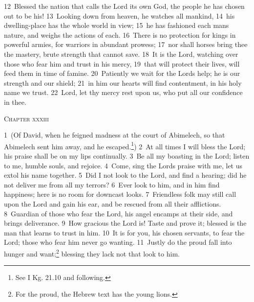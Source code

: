 \documentclass[10pt]{book} %
\begin{document}
\textcolor{benred8}{12}~Blessed the nation that calls the Lord its own God, the people he has chosen out to be his! \textcolor{benred8}{13}~Looking down from heaven, he watches all mankind, \textcolor{benred8}{14}~his dwelling-place has the whole world in view; \textcolor{benred8}{15}~he has fashioned each man\textquotesingle s nature, and weighs the actions of each. \textcolor{benred8}{16}~There is no protection for kings in powerful armies, for warriors in abundant prowess; \textcolor{benred8}{17}~nor shall horses bring thee the mastery, brute strength that cannot save. \textcolor{benred8}{18}~It is the Lord, watching over those who fear him and trust in his mercy, \textcolor{benred8}{19}~that will protect their lives, will feed them in time of famine. \textcolor{benred8}{20}~Patiently we wait for the Lord\textquotesingle s help; he is our strength and our shield; \textcolor{benred8}{21}~in him our hearts will find contentment, in his holy name we trust. \textcolor{benred8}{22}~Lord, let thy mercy rest upon us, who put all our confidence in thee.
\begin{large}\begin{center}\textsc{Chapter xxxiii}\end{center}\end{large}
\textcolor{benred8}{1}~(Of David, when he feigned madness at the court of Abimelech, so that Abimelech sent him away, and he escaped.\footnote[1]{See I Kg. 21.10 and following.})
\textcolor{benred8}{2}~At all times I will bless the Lord; his praise shall be on my lips continually. \textcolor{benred8}{3}~Be all my boasting in the Lord; listen to me, humble souls, and rejoice. \textcolor{benred8}{4}~Come, sing the Lord\textquotesingle s praise with me, let us extol his name together. \textcolor{benred8}{5}~Did I not look to the Lord, and find a hearing; did he not deliver me from all my terrors? \textcolor{benred8}{6}~Ever look to him, and in him find happiness; here is no room for downcast looks. \textcolor{benred8}{7}~Friendless folk may still call upon the Lord and gain his ear, and be rescued from all their afflictions. \textcolor{benred8}{8}~Guardian of those who fear the Lord, his angel encamps at their side, and brings deliverance. \textcolor{benred8}{9}~How gracious the Lord is! Taste and prove it; blessed is the man that learns to trust in him. \textcolor{benred8}{10}~It is for you, his chosen servants, to fear the Lord; those who fear him never go wanting. \textcolor{benred8}{11}~Justly do the proud fall into hunger and want;\footnote[2]{For \textasciigrave the proud\textquotesingle , the Hebrew text has \textasciigrave the young lions\textquotesingle .} blessing they lack not that look to him.
\end{document}
